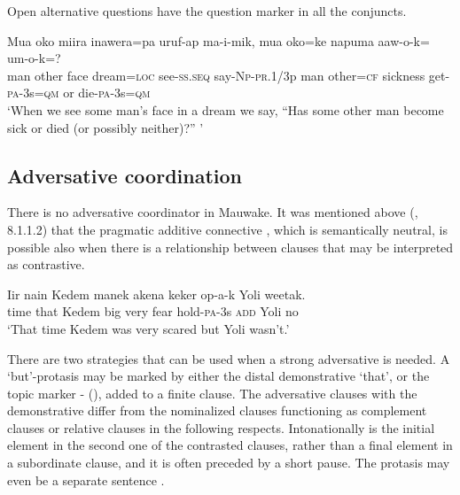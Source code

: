 Open alternative questions have the question marker in all the conjuncts.

\ea%
\label{ex:8:x1384}
\gll Mua  oko  miira  inawera=pa  uruf-ap  ma-i-mik, mua  oko=ke  napuma  aaw-o-k=    um-o-k=?\\
man  other  face  dream=\textsc{loc}  see-\textsc{ss}.\textsc{seq}  say-\textsc{Np}-\textsc{pr}.1/3p man  other=\textsc{cf} sickness  get-\textsc{pa}-3s=\textsc{qm}  or  die-\textsc{pa}-3s=\textsc{qm}\\
\glt`When we see some man's face in a dream we say, ``Has some other man become sick or died (or possibly neither)?'' '
\z


\subsection{Adversative coordination} \label{sec:8.1.3}

There is no adversative coordinator in Mauwake. It was mentioned above  (, 8.1.1.2) that the pragmatic additive connective , which is semantically neutral, is possible also when there is a relationship between clauses that may be interpreted as contrastive. 

\ea%
\label{ex:8:x1388}
\gll Iir  nain  Kedem  manek  akena  keker  op-a-k   Yoli  weetak.\\
time  that  Kedem  big  very  fear  hold-\textsc{pa}-3s \textsc{add}  Yoli  no \\
\glt`That time Kedem was very scared but Yoli wasn't.'
\z


There are two strategies that can be used when a strong adversative is needed. A `but'-protasis \citep[237]{Reesink1983b} may be marked by either the distal demonstrative  `that', or the topic marker - (), added to a finite clause. The adversative clauses with the demonstrative  differ from the nominalized clauses functioning as complement clauses or relative clauses in the following respects. Intonationally  is the initial element in the second one of the contrasted clauses, rather than a final element in a subordinate clause, and it is often preceded by a short pause. The protasis may even be a separate sentence . 

